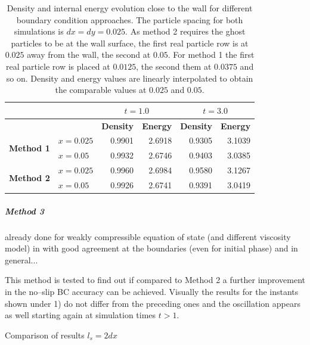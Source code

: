 \documentclass{report}
\begin{document}
\begin{table}[h] %
\label{tab:2DSPH_LinearWall_Poiseuille_WallErrorsRho_e}
\centering
\begin{tabular}[c]{||c||l||r|r||r|r||} %
\hline
&&\multicolumn{2}{|c|}{\textbf{$t=1.0$}}& \multicolumn{2}{|c|}{\textbf{$t=3.0$}}\\
\hline
 &&{\bf Density} & {\bf Energy} & {\bf Density}& {\bf Energy}\\
\hline
\hline
\multirow{2}{*}{{\bf Method 1}} &$x=0.025$&0.9901 & 2.6918 & 0.9305& 3.1039 \\
\hline
&$x=0.05$&0.9932 &2.6746 &0.9403 & 3.0385\\
\hline
\multirow{2}{*}{{\bf Method 2}}&$x=0.025$&0.9960 & 2.6984& 0.9580 & 3.1267 \\
\hline
&$x=0.05$&0.9926 & 2.6741 & 0.9391&3.0419 \\
\hline
\hline
\end{tabular}
\caption[]{Density and internal energy evolution close to the wall for different boundary condition approaches. The particle spacing for both simulations is $dx=dy=0.025$. As method 2 requires the ghost particles to be at the wall surface, the first real particle row is at $0.025$ away from the wall, the second at $0.05$. For method 1 the first real particle row is placed at $0.0125$, the second them at $0.0375$ and so on. Density and energy values are linearly interpolated to obtain the comparable values at $0.025$ and $0.05$.}
\end{table}




\subparagraph{Method 3}

already done for weakly compressible equation of state (and different viscosity model) in \cite{Morris1997} with good agreement at the boundaries (even for initial phase) and in general... 

This method is tested to find out if compared to Method 2 a further improvement in the no--slip BC accuracy can be achieved. Visually the results for the instants shown under 1) do not differ from the preceding ones and the oscillation appears as well starting again at simulation times $t>1$.



Comparison of results $l_s=2dx$
\end{document}
